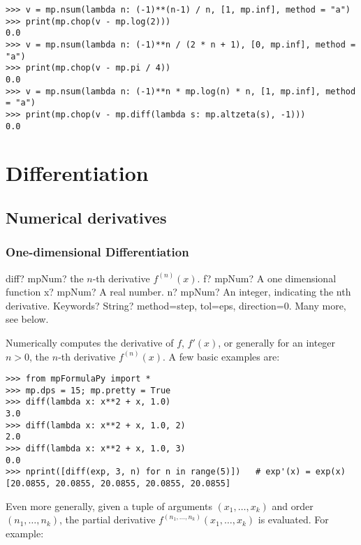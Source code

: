 \begin{lstlisting}
>>> v = mp.nsum(lambda n: (-1)**(n-1) / n, [1, mp.inf], method = "a")
>>> print(mp.chop(v - mp.log(2)))
0.0
>>> v = mp.nsum(lambda n: (-1)**n / (2 * n + 1), [0, mp.inf], method = "a")
>>> print(mp.chop(v - mp.pi / 4))
0.0
>>> v = mp.nsum(lambda n: (-1)**n * mp.log(n) * n, [1, mp.inf], method = "a")
>>> print(mp.chop(v - mp.diff(lambda s: mp.altzeta(s), -1)))
0.0
\end{lstlisting}





\newpage
\chapter{Differentiation}

\section{Numerical derivatives}


\subsection{One-dimensional Differentiation}

\begin{mpFunctionsExtract}
	\mpFunctionFour
	{diff? mpNum? the $n$-th derivative $f^{(n)}(x)$.}
	{f? mpNum? A one dimensional function}
	{x? mpNum? A real number.}
	{n? mpNum? An integer, indicating the nth derivative.}		
	{Keywords? String? method=step, tol=eps, direction=0. Many more, see below.}	
\end{mpFunctionsExtract}


\vpara
Numerically computes the derivative of $f$, $f'(x)$, or generally for an integer $n>0$, the $n$-th derivative $f^{(n)}(x)$. A few basic examples are:

\begin{lstlisting}
>>> from mpFormulaPy import *
>>> mp.dps = 15; mp.pretty = True
>>> diff(lambda x: x**2 + x, 1.0)
3.0
>>> diff(lambda x: x**2 + x, 1.0, 2)
2.0
>>> diff(lambda x: x**2 + x, 1.0, 3)
0.0
>>> nprint([diff(exp, 3, n) for n in range(5)])   # exp'(x) = exp(x)
[20.0855, 20.0855, 20.0855, 20.0855, 20.0855]
\end{lstlisting}

Even more generally, given a tuple of arguments $(x_1,\dots,x_k)$ and  order $(n_1,\dots,n_k)$, the partial derivative $f^{(n_1,\dots,n_k)}(x_1,\dots,x_k)$ is evaluated. For example:

